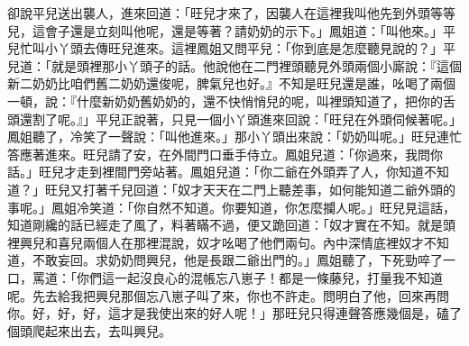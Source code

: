 卻說平兒送出襲人，進來回道：「旺兒才來了，因襲人在這裡我叫他先到外頭等等兒，這會子還是立刻叫他呢，還是等著？請奶奶的示下。」鳳姐道：「叫他來。」平兒忙叫小丫頭去傳旺兒進來。這裡鳳姐又問平兒：「你到底是怎麼聽見說的？」平兒道：「就是頭裡那小丫頭子的話。他說他在二門裡頭聽見外頭兩個小廝說：『這個新二奶奶比咱們舊二奶奶還俊呢，脾氣兒也好。』不知是旺兒還是誰，吆喝了兩個一頓，說：『什麼新奶奶舊奶奶的，還不快悄悄兒的呢，叫裡頭知道了，把你的舌頭還割了呢。』」平兒正說著，只見一個小丫頭進來回說：「旺兒在外頭伺候著呢。」鳳姐聽了，冷笑了一聲說：「叫他進來。」那小丫頭出來說：「奶奶叫呢。」旺兒連忙答應著進來。旺兒請了安，在外間門口垂手侍立。鳳姐兒道：「你過來，我問你話。」旺兒才走到裡間門旁站著。鳳姐兒道：「你二爺在外頭弄了人，你知道不知道？」旺兒又打著千兒回道：「奴才天天在二門上聽差事，如何能知道二爺外頭的事呢。」鳳姐冷笑道：「你自然不知道。你要知道，你怎麼攔人呢。」旺兒見這話，知道剛纔的話已經走了風了，料著瞞不過，便又跪回道：「奴才實在不知。就是頭裡興兒和喜兒兩個人在那裡混說，奴才吆喝了他們兩句。內中深情底裡奴才不知道，不敢妄回。求奶奶問興兒，他是長跟二爺出門的。」鳳姐聽了，下死勁啐了一口，罵道：「你們這一起沒良心的混帳忘八崽子！都是一條藤兒，打量我不知道呢。先去給我把興兒那個忘八崽子叫了來，你也不許走。問明白了他，回來再問你。好，好，好，這才是我使出來的好人呢！」那旺兒只得連聲答應幾個是，磕了個頭爬起來出去，去叫興兒。

